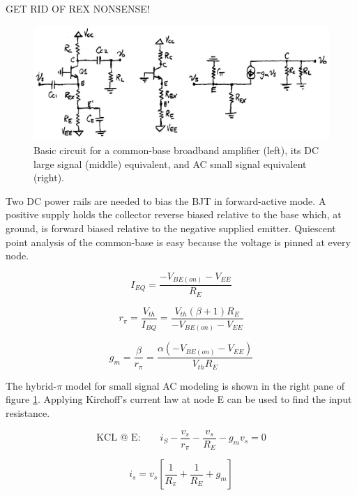 \documentclass[titlepage, letterpaper, 11pt]{article}
\begin{document}
GET RID OF REX NONSENSE!

\begin{figure}[ht]
	\centering
	\includegraphics[width=\textwidth]
		{figures/commonBaseAmplifier.png}
	\caption{
		Basic circuit for a common-base broadband amplifier
		(left), its DC large signal (middle) equivalent, and
		AC small signal equivalent (right).
	}
	\label{commonBaseAmplifier}
\end{figure}

Two DC power rails are needed to bias the BJT in forward-active mode.
A positive supply holds the collector reverse biased
relative to the base which, at ground, is forward biased relative
to the negative supplied emitter. Quiescent point analysis of the
common-base is easy because the voltage is pinned at every node.

\begin{equation}
I_{EQ}=\frac{-V_{BE(on)}-V_{EE}}{R_{E}}
\end{equation}

\begin{equation}
r_{\pi}=\frac{V_{th}}{I_{BQ}}
=\frac{V_{th}(\beta+1)R_{E}}{-V_{BE(on)}-V_{EE}}
\label{commonBaseRpi}
\end{equation}

\begin{equation}
g_{m}=\frac{\beta}{r_{\pi}}
=\frac{\alpha(-V_{BE(on)}-V_{EE})}{V_{th}R_{E}}
\end{equation}

The hybrid-$\pi$ model for small signal AC modeling is shown in the
right pane of figure \ref{commonBaseAmplifier}. Applying Kirchoff's
current law at node E can be used to find the input resistance.

\begin{equation*}
\textrm{KCL @ E:}\qquad
i_{S}-\frac{v_{s}}{r_{\pi}}-\frac{v_{s}}{R_{E}}-g_{m}v_{s}=0
\end{equation*}

\begin{equation*}
i_{s}=v_{s} \left[ \frac{1}{R_{\pi}}+\frac{1}{R_{E}}+g_{m} \right]
\end{equation*}
\end{document}
